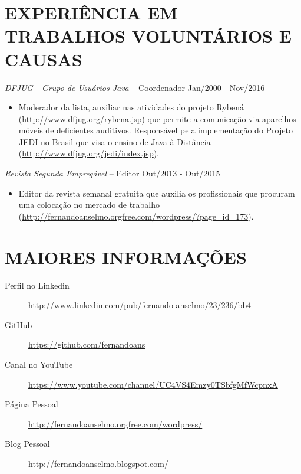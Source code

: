 \documentclass{res}
\begin{document}
\begin{resume}
		\section{EXPERIÊNCIA EM TRABALHOS VOLUNTÁRIOS E CAUSAS}
		\vspace{8pt} 
		{\sl DFJUG - Grupo de Usuários Java} -- Coordenador \hfill Jan/2000 - Nov/2016
		\begin{itemize}
			\item Moderador da lista, auxiliar nas atividades do projeto Rybená (\url{http://www.dfjug.org/rybena.jsp}) 
			que permite a comunicação via aparelhos móveis de deficientes auditivos. Responsável pela implementação 
			do Projeto JEDI no Brasil que visa o ensino de Java à Distância (\url{http://www.dfjug.org/jedi/index.jsp}).
		\end{itemize}
		
		{\sl Revista Segunda Empregável} -- Editor \hfill   Out/2013 - Out/2015
		\begin{itemize}
			\item Editor da revista semanal gratuita que auxilia os profissionais 
			que procuram uma colocação no mercado de trabalho (\url{http://fernandoanselmo.orgfree.com/wordpress/?page_id=173}).
		\end{itemize}
		
		\section{MAIORES INFORMAÇÕES}
		\vspace{18pt} 
		\begin{description}
			\item[Perfil no Linkedin] \url{http://www.linkedin.com/pub/fernando-anselmo/23/236/bb4}
			\item[GitHub] \url{https://github.com/fernandoans}
			\item[Canal no YouTube] \url{https://www.youtube.com/channel/UC4VS4Emzy0TSbfgMfWcpnxA}
			\item[Página Pessoal] \url{http://fernandoanselmo.orgfree.com/wordpress/}
			\item[Blog Pessoal] \url{http://fernandoanselmo.blogspot.com/}
		\end{description}
	\end{resume} 
\end{document}
